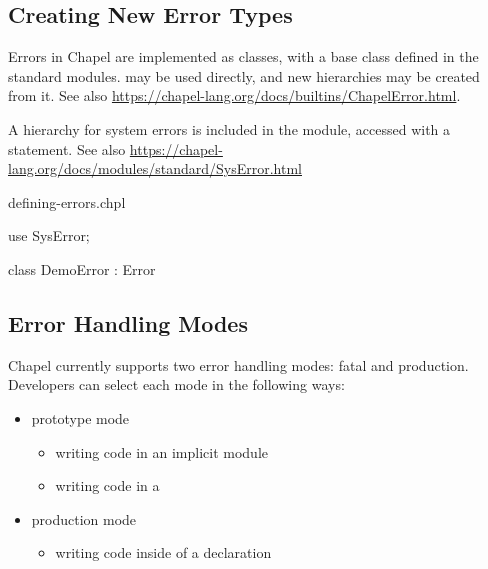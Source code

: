 \subsection{Creating New Error Types}
\label{Creating_New_Error_Types}

Errors in Chapel are implemented as classes, with a base class 
defined in the standard modules.  may be used directly, and new
hierarchies may be created from it.  See also
\url{https://chapel-lang.org/docs/builtins/ChapelError.html}.

A hierarchy for system errors is included in the  module,
accessed with a  statement.  See also
\url{https://chapel-lang.org/docs/modules/standard/SysError.html}

\begin{chapelexample}{defining-errors.chpl}
\begin{chapel}
use SysError;

class DemoError : Error { }
\end{chapel}
\begin{chapelpost}
\end{chapelpost}
\begin{chapeloutput}
\end{chapeloutput}
\end{chapelexample}

\subsection{Error Handling Modes}
\label{Error_Handling_Modes}

Chapel currently supports two error handling modes: fatal and
production.  Developers can select each mode in the following ways:

\begin{itemize}

\item prototype mode

\begin{itemize}
\item writing code in an implicit module
\item writing code in a 
\end{itemize}

\item production mode

\begin{itemize}
\item writing code inside of a  declaration
\end{itemize}

\end{itemize}

